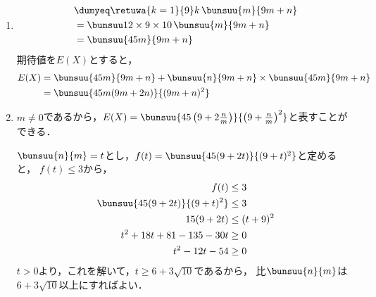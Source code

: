 \begin{enumerate}
  \item
  \begin{align*}
    &\dumyeq\retuwa{k=1}{9} k\,\bunsuu{m}{9m + n} \\
    &= \bunsuu12 \times 9 \times 10\,\bunsuu{m}{9m + n} \\
    &= \bunsuu{45m}{9m + n}
  \end{align*}
  期待値を$E(X)$とすると，
  \begin{align*}
    E(X) &= \bunsuu{45m}{9m + n} + \bunsuu{n}{9m + n} \times
      \bunsuu{45m}{9m + n} \\
    &= \bunsuu{45m(9m + 2n)}{(9m + n)^2}
  \end{align*}

  \item $m \neq 0$であるから，$E(X) = \bunsuu{45\left(9 + 2\frac{n}{m}\right)}{\left(9 + \frac{n}{m}\right)^2}$と表すことができる．

  $\bunsuu{n}{m} = t$とし，$f(t) = \bunsuu{45(9 + 2t)}{(9+t)^2}$と定めると，
  $f(t) \leq 3$から，
  \begin{align*}
    f(t) &\leq 3 \\
    \bunsuu{45(9+2t)}{(9+t)^2} &\leq 3 \\
    15(9+2t) &\leq (t+9)^2 \\
    t^2 + 18t + 81 - 135 - 30t &\geq 0\\
    t^2 - 12t - 54 &\geq 0
  \end{align*}
  $t > 0$より，これを解いて，$t \geq 6 + 3\sqrt{10}$であるから，
  比$\bunsuu{n}{m}$は$6 + 3\sqrt{10}$以上にすればよい．

\end{enumerate}
